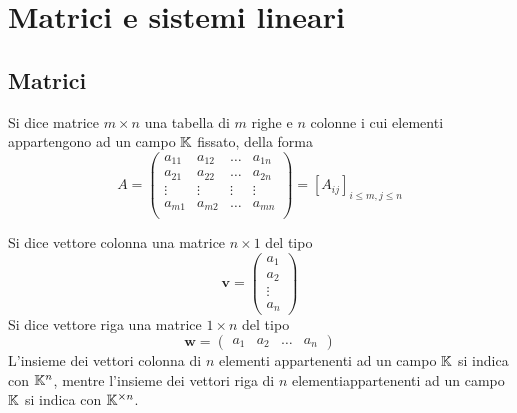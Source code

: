 \chapter{Matrici e sistemi lineari}

\section{Matrici}

\begin{definition}
    Si dice matrice $m \times n$ una tabella di $m$ righe e $n$ colonne i cui elementi appartengono ad un campo $\mathbb{K}$ fissato, della forma
    \begin{equation}
        A = \begin{pmatrix}
            a_{11}  &   a_{12}  & \dots     & a_{1n} \\
            a_{21}  &   a_{22}  & \dots     & a_{2n} \\
            \vdots  &   \vdots  & \vdots    & \vdots \\
            a_{m1}  &   a_{m2}  & \dots     & a_{mn} \\
        \end{pmatrix}
        = [A_{ij}]_{i\leq m, j \leq n}
    \end{equation}
\end{definition}

\begin{definition}
    Si dice vettore colonna una matrice $n \times 1$ del tipo
    \begin{equation}
        \bm{v} = \begin{pmatrix}
            a_{1} \\
            a_{2} \\
            \vdots \\
            a_n
        \end{pmatrix}
    \end{equation}
    Si dice vettore riga una matrice $1 \times n$ del tipo
    \begin{equation}
        \bm{w} = \begin{pmatrix}
            a_{1} & a_2 & \dots & a_n
        \end{pmatrix}
    \end{equation}
    L'insieme dei vettori colonna di $n$ elementi appartenenti ad un campo $\mathbb{K}$ si indica con $\mathbb{K}^n$, mentre l'insieme dei vettori riga di $n$ elementiappartenenti ad un campo $\mathbb{K}$ si indica con $\mathbb{K}^{\times n}$.
\end{definition}

